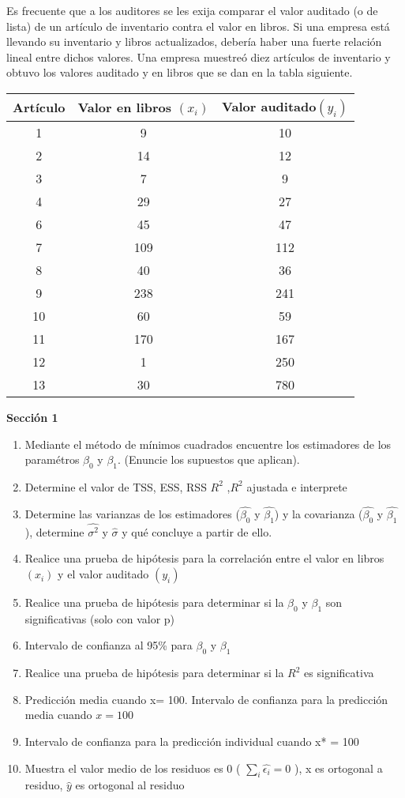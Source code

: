\documentclass{../oxmathproblems}
\begin{document}
\begin{questions}

\miquestion Es frecuente que a los auditores se les exija comparar el valor auditado (o de lista) de un artículo de inventario contra el valor en libros. Si una empresa está llevando su inventario y libros actualizados, debería haber una fuerte relación lineal entre dichos valores. Una empresa muestreó diez artículos de inventario y obtuvo los valores auditado y en libros que se dan en la tabla siguiente. 

\begin{tabular}{|c|c|c|}
\hline
Artículo & Valor en libros $(x_i)$ & Valor auditado$(y_i)$ \\ \hline
1 & 9 & 10\\
2 & 14 & 12\\
3 & 7 & 9\\ 
4 & 29  & 27\\ 
6 & 45 & 47\\ 
7 & 109 & 112\\ 
8 & 40 & 36\\ 
9 & 238 & 241\\ 
10 & 60 & 59\\
11 & 170 & 167\\
12 & 1 & 250\\
13 & 30 & 780\\
\hline
\end{tabular}


\textbf {Sección 1} 

\begin{enumerate}
  \item Mediante el método de mínimos cuadrados encuentre los estimadores de los paramétros $\beta_0$ y $\beta_1$. (Enuncie los supuestos que aplican). 
  \item Determine el valor de TSS, ESS, RSS  $R^2$ ,$R^2$ ajustada   e interprete 
  \item Determine las varianzas de los estimadores ($\hat{\beta_0}$ y $\hat{\beta_1}$) y la covarianza  ($\hat{\beta_0}$ y $\hat{\beta_1}$), determine $\hat{\sigma^2}$ y $\hat{\sigma}$ y qué concluye a partir de ello.
  \item Realice una prueba de hipótesis para la correlación entre el valor en libros $(x_i)$ y el valor auditado $(y_i)$
  \item Realice una prueba de hipótesis para determinar si la  $\beta_0$ y $\beta_1$ son significativas (solo con valor p) 
  \item Intervalo de confianza al 95\% para $\beta_0$ y $\beta_1$ 
   \item Realice una prueba de hipótesis para determinar si la $R^2$ es significativa
   \item Predicción media cuando x= 100. Intervalo de confianza para la predicción media cuando $x = 100$
   \item Intervalo de confianza para la predicción individual cuando x* = 100
   \item Muestra el valor medio de los residuos es 0 ( $\sum_{i}\hat{\epsilon_i}=0$ ), x es ortogonal a residuo, $\hat{y}$  es ortogonal al residuo  
\end{enumerate}





\end{questions}
\end{document}
